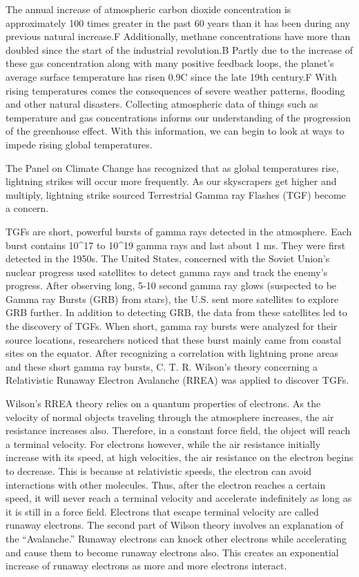 \documentclass[12pt,]{article}
\begin{document}
The annual increase of atmospheric carbon dioxide concentration is
approximately 100 times greater in the past 60 years than it has been
during any previous natural increase.F Additionally, methane
concentrations have more than doubled since the start of the industrial
revolution.B Partly due to the increase of these gas concentration along
with many positive feedback loops, the planet's average surface
temperature has risen 0.9\degree C since the late 19th century.F With
rising temperatures comes the consequences of severe weather patterns,
flooding and other natural disasters. Collecting atmospheric data of
things such as temperature and gas concentrations informs our
understanding of the progression of the greenhouse effect. With this
information, we can begin to look at ways to impede rising global
temperatures.

The Panel on Climate Change has recognized that as global temperatures
rise, lightning strikes will occur more frequently. As our skyscrapers
get higher and multiply, lightning strike sourced Terrestrial Gamma ray
Flashes (TGF) become a concern.

TGFs are short, powerful bursts of gamma rays detected in the
atmosphere. Each burst contains 10\^{}17 to 10\^{}19 gamma rays and last
about 1 ms. They were first detected in the 1950s. The United States,
concerned with the Soviet Union's nuclear progress used satellites to
detect gamma rays and track the enemy's progress. After observing long,
5-10 second gamma ray glows (suspected to be Gamma ray Bursts (GRB) from
stars), the U.S. sent more satellites to explore GRB further. In
addition to detecting GRB, the data from these satellites led to the
discovery of TGFs. When short, gamma ray bursts were analyzed for their
source locations, researchers noticed that these burst mainly came from
coastal sites on the equator. After recognizing a correlation with
lightning prone areas and these short gamma ray bursts, C. T. R.
Wilson's theory concerning a Relativistic Runaway Electron Avalanche
(RREA) was applied to discover TGFs.

Wilson's RREA theory relies on a quantum properties of electrons. As the
velocity of normal objects traveling through the atmosphere increases,
the air resistance increases also. Therefore, in a constant force field,
the object will reach a terminal velocity. For electrons however, while
the air resistance initially increase with its speed, at high
velocities, the air resistance on the electron begins to decrease. This
is because at relativistic speeds, the electron can avoid interactions
with other molecules. Thus, after the electron reaches a certain speed,
it will never reach a terminal velocity and accelerate indefinitely as
long as it is still in a force field. Electrons that escape terminal
velocity are called runaway electrons. The second part of Wilson theory
involves an explanation of the ``Avalanche.'' Runaway electrons can
knock other electrons while accelerating and cause them to become
runaway electrons also. This creates an exponential increase of runaway
electrons as more and more electrons interact.
\end{document}
